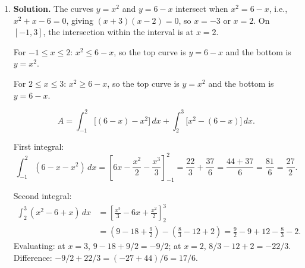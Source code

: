 \begin{enumerate}
\begin{enumerate}
Correcting: $R$ as stated (with $x^2 \le y \le 8+x$ for $0\le x\le 4$) is Type I because the bounds on $y$ are given explicitly as functions of $x$.

\item As Type II: $y$ ranges from $\min(x^2)=0$ to $\max(8+x)=12$, so $y\in[0,12]$. For a given $y$, the left boundary comes from $x^2=y$ (i.e., $x=\sqrt{y}$) or $x=0$, and the right boundary comes from $y=8+x$ (i.e., $x=y-8$) or $x=4$. The region must be split:

As Type II, we solve for $x$: from $y=x^2$ we get $x=\sqrt{y}$, from $y=8+x$ we get $x=y-8$, and we have $0\le x\le 4$.

For $0\le y\le 8$: $x$ runs from $0$ to $\sqrt{y}$ (since $y-8<0$).

For $8 < y \le 9$: $x$ runs from $y-8$ to $\sqrt{y}$ (since both bounds are in $[0,4]$).

For $9 < y \le 12$: $x$ runs from $y-8$ to $4$ (since $\sqrt{y}>4$ would require $y>16$; actually $\sqrt{12}\approx 3.46<4$, so $x$ runs from $y-8$ to $\sqrt{y}$).

Let $x_0 = \frac{1+\sqrt{33}}{2}$. At the intersection, $y_0 = x_0^2$. For $y > y_0$, the parabola $x=\sqrt{y}$ exceeds the line $x=y-8$ but we also need $x\le 4$. At $y=12$: $\sqrt{12}<4$ and $y-8=4$, so $x$ from $\sqrt{y}$ to $4$---but this reverses. The Type II description requires careful case analysis, confirming that the Type I description is simpler.
\end{enumerate}

\item \textbf{Solution.}
The curves $y=x^2$ and $y=6-x$ intersect when $x^2 = 6-x$, i.e., $x^2+x-6=0$, giving $(x+3)(x-2)=0$, so $x=-3$ or $x=2$. On $[-1,3]$, the intersection within the interval is at $x=2$.

For $-1\le x\le 2$: $x^2 \le 6-x$, so the top curve is $y=6-x$ and the bottom is $y=x^2$.

For $2\le x\le 3$: $x^2 \ge 6-x$, so the top curve is $y=x^2$ and the bottom is $y=6-x$.

\[
A = \int_{-1}^2\bigl[(6-x)-x^2\bigr]\,dx + \int_2^3\bigl[x^2-(6-x)\bigr]\,dx.
\]

First integral:
\[
\int_{-1}^2(6-x-x^2)\,dx = \left[6x - \frac{x^2}{2}-\frac{x^3}{3}\right]_{-1}^2 = \frac{22}{3}+\frac{37}{6} = \frac{44+37}{6}=\frac{81}{6}=\frac{27}{2}.
\]

Second integral:
\begin{align*}
\int_2^3(x^2-6+x)\,dx &= \left[\frac{x^3}{3}-6x+\frac{x^2}{2}\right]_2^3 \\
&= \left(9-18+\frac{9}{2}\right)-\left(\frac{8}{3}-12+2\right) = \frac{9}{2}-9+12-\frac{8}{3}-2.
\end{align*}
Evaluating: at $x=3$, $9-18+9/2 = -9/2$; at $x=2$, $8/3-12+2 = -22/3$. Difference: $-9/2+22/3 = (-27+44)/6 = 17/6$.


\end{enumerate}
